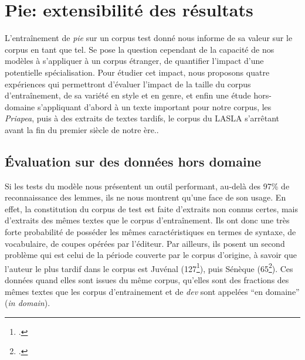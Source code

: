 \section{Pie: extensibilité des résultats}

L'entraînement de \textit{pie} sur un corpus test donné nous informe de sa valeur sur le corpus en tant que tel. Se pose la question cependant de la capacité de nos modèles à s'appliquer à un corpus étranger, de quantifier l'impact d'une potentielle spécialisation. Pour étudier cet impact, nous proposons quatre expériences qui permettront d'évaluer l'impact de la taille du corpus d'entraînement, de sa variété en style et en genre, et enfin une étude hors-domaine s'appliquant d'abord à un texte important pour notre corpus, les \textit{Priapea}, puis à des extraits de textes tardifs, le corpus du LASLA s'arrêtant avant la fin du premier siècle de notre ère..

\subsection{Évaluation sur des données hors domaine}
\label{subsec:lemmatisation:hors-domaine}

Si les tests du modèle nous présentent un outil performant, au-delà des 97\% de reconnaissance des lemmes, ils ne nous montrent qu'une face de son usage. En effet, la constitution du corpus de test est faite d'extraits non connus certes, mais d'extraits des mêmes textes que le corpus d'entraînement. Ils ont donc une très forte probabilité de posséder les mêmes caractéristiques en termes de syntaxe, de vocabulaire, de coupes opérées par l'éditeur. Par ailleurs, ils posent un second problème qui est celui de la période couverte par le corpus d'origine, à savoir que l'auteur le plus tardif dans le corpus est Juvénal (127\footcite[p. 320]{zehnacker_litterature_2013}), puis Sénèque (65\footcite[p. 231]{zehnacker_litterature_2013}). Ces données quand elles sont issues du même corpus, qu'elles sont des fractions des mêmes textes que les corpus d'entrainement et de \textit{dev} sont appelées \enquote{en domaine} (\textit{in domain}).

